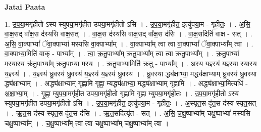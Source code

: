 \documentclass[17pt]{extarticle}
\begin{document}
\textbf{Jatai Paata} \newline

1. उ॒प॒या॒मगृ॑हीतो ऽस्य स्युपया॒मगृ॑हीत उपया॒मगृ॑हीतो ऽसि । . उ॒प॒या॒मगृ॑हीत॒ इत्यु॑पया॒म - गृ॒ही॒तः॒ । . अ॒सि॒ वा॒क्ष॒सद् वा᳚क्ष॒स द॑स्यसि वाक्ष॒सत् । . वा॒क्ष॒स द॑स्यसि वाक्ष॒सद् वा᳚क्ष॒स द॑सि । . वा॒क्ष॒सदिति॑ वाक्ष - सत् । . अ॒सि॒ वा॒क्पाभ्यां᳚ ॅवा॒क्पाभ्या॑ मस्यसि वा॒क्पाभ्या᳚म् । . वा॒क्पाभ्या᳚म् त्वा त्वा वा॒क्पाभ्यां᳚ ॅवा॒क्पाभ्या᳚म् त्वा । . वा॒क्पाभ्या॒मिति॑ वाक् - पाभ्या᳚म् । . त्वा॒ क्र॒तु॒पाभ्या᳚म् क्रतु॒पाभ्या᳚म् त्वा त्वा क्रतु॒पाभ्या᳚म् । . क्र॒तु॒पाभ्या॑ म॒स्यास्य क्र॑तु॒पाभ्या᳚म् क्रतु॒पाभ्या॑ म॒स्य । . क्र॒तु॒पाभ्या॒मिति॑ क्रतु - पाभ्या᳚म् । . अ॒स्य य॒ज्ञ्स्य॑ य॒ज्ञ्स्या॒ स्यास्य य॒ज्ञ्स्य॑ । . य॒ज्ञ्स्य॑ ध्रु॒वस्य॑ ध्रु॒वस्य॑ य॒ज्ञ्स्य॑ य॒ज्ञ्स्य॑ ध्रु॒वस्य॑ । . ध्रु॒वस्या द्ध्य॑क्षाभ्या॒ मद्ध्य॑क्षाभ्याम् ध्रु॒वस्य॑ ध्रु॒वस्या द्ध्य॑क्षाभ्याम् । . अद्ध्य॑क्षाभ्याम् गृह्णामि गृह्णा॒ म्यद्ध्य॑क्षाभ्या॒ मद्ध्य॑क्षाभ्याम् गृह्णामि । . अद्ध्य॑क्षाभ्या॒मित्यधि॑ - अ॒क्षा॒भ्या॒म् । . गृ॒ह्णा॒ म्यु॒प॒या॒मगृ॑हीत उपया॒मगृ॑हीतो गृह्णामि गृह्णा म्युपया॒मगृ॑हीतः । . उ॒प॒या॒मगृ॑हीतो ऽस्य स्युपया॒मगृ॑हीत उपया॒मगृ॑हीतो ऽसि । . उ॒प॒या॒मगृ॑हीत॒ इत्यु॑पया॒म - गृ॒ही॒तः॒ । . अ॒स्यृ॒त॒स दृ॑त॒स द॑स्य स्यृत॒सत् । . ऋ॒त॒स द॑स्य स्यृत॒स दृ॑त॒स द॑सि । . ऋ॒त॒सदित्यृ॑त - सत् । . अ॒सि॒ च॒क्षु॒ष्पाभ्या᳚म् चक्षु॒ष्पाभ्या॑ मस्यसि चक्षु॒ष्पाभ्या᳚म् । . च॒क्षु॒ष्पाभ्या᳚म् त्वा त्वा चक्षु॒ष्पाभ्या᳚म् चक्षु॒ष्पाभ्या᳚म् त्वा । \newline
\end{document}
